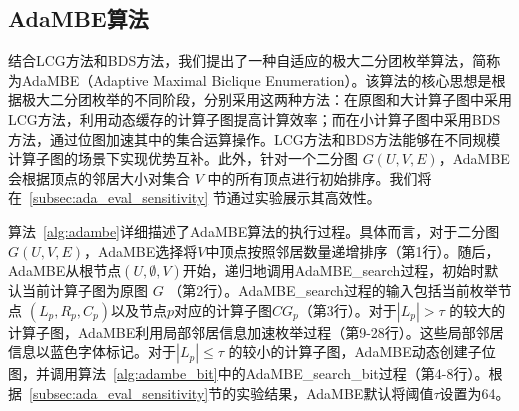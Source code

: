 \subsection{AdaMBE算法}
\label{subsec:ada_design_all}

结合LCG方法和BDS方法，我们提出了一种自适应的极大二分团枚举算法，简称为AdaMBE（Adaptive Maximal Biclique Enumeration）。该算法的核心思想是根据极大二分团枚举的不同阶段，分别采用这两种方法：在原图和大计算子图中采用LCG方法，利用动态缓存的计算子图提高计算效率；而在小计算子图中采用BDS方法，通过位图加速其中的集合运算操作。LCG方法和BDS方法能够在不同规模计算子图的场景下实现优势互补。此外，针对一个二分图 $G(U,V,E)$，AdaMBE会根据顶点的邻居大小对集合 $V$ 中的所有顶点进行初始排序。我们将在~\ref{subsec:ada_eval_sensitivity} 节通过实验展示其高效性。




算法~\ref{alg:adambe}详细描述了AdaMBE算法的执行过程。具体而言，对于二分图 $G(U,V,E)$，AdaMBE选择将$V$中顶点按照邻居数量递增排序（第1行）。随后，AdaMBE从根节点$(U,\emptyset,V)$开始，递归地调用\textsf{AdaMBE\_search}过程，初始时默认当前计算子图为原图 $G$ （第2行）。\textsf{AdaMBE\_search}过程的输入包括当前枚举节点 $(L_p, R_p, C_p)$以及节点$p$对应的计算子图$CG_p$（第3行）。对于$|L_p| > \tau$ 的较大的计算子图，AdaMBE利用局部邻居信息加速枚举过程（第9-28行）。这些局部邻居信息以蓝色字体标记。对于$|L_p| \le \tau$ 的较小的计算子图，AdaMBE动态创建子位图，并调用算法~\ref{alg:adambe_bit}中的\textsf{AdaMBE\_search\_bit}过程（第4-8行）。根据~\ref{subsec:ada_eval_sensitivity}节的实验结果，AdaMBE默认将阈值$\tau$设置为64。






